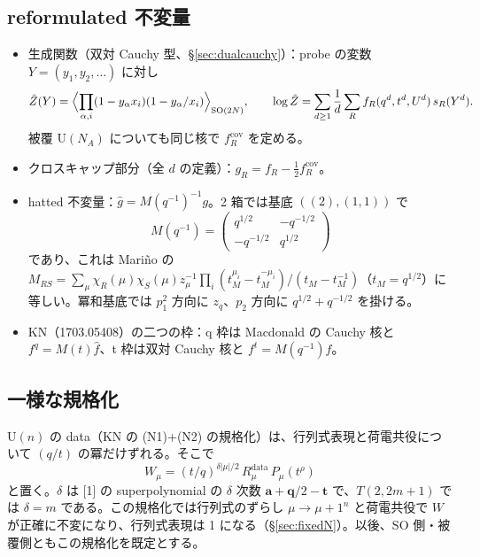 \documentclass[a4paper,10pt]{ltjsarticle}
\newcommand{\ba}{\bm{a}}
\newcommand{\bq}{\bm{q}}
\newcommand{\bt}{\bm{t}}
\begin{document}
\subsection{reformulated 不変量}
\begin{itemize}
\item 生成関数（双対 Cauchy 型、§\ref{sec:dualcauchy}）：probe の変数 $Y = (y_1, y_2, \dots)$ に対し
\[
\tilde Z(Y) = \Bigl\langle \prod_{\alpha, i} (1 - y_\alpha x_i)(1 - y_\alpha / x_i) \Bigr\rangle_{\mathrm{SO}(2N)},\qquad
\log \tilde Z = \sum_{d \ge 1} \frac1d \sum_R f_R(q^d, t^d, U^d)\, s_R(Y^d).
\]
被覆 U$(N_A)$ についても同じ核で $f^{\mathrm{cov}}_R$ を定める。
\item クロスキャップ部分（全 $d$ の定義）：$g_R = f_R - \tfrac12 f^{\mathrm{cov}}_R$。
\item hatted 不変量：$\hat g = M(q^{-1})^{-1} g$。2 箱では基底 $((2), (1,1))$ で
\[
M(q^{-1}) = \begin{pmatrix} q^{1/2} & -q^{-1/2} \\ -q^{-1/2} & q^{1/2} \end{pmatrix}
\]
であり、これは Mariño の $M_{RS} = \sum_\mu \chi_R(\mu)\chi_S(\mu) z_\mu^{-1} \prod_i (t_M^{\mu_i} - t_M^{-\mu_i})/(t_M - t_M^{-1})$（$t_M = q^{1/2}$）に等しい。冪和基底では $p_1^2$ 方向に $z_q$、$p_2$ 方向に $q^{1/2} + q^{-1/2}$ を掛ける。
\item KN（1703.05408）の二つの枠：q 枠は Macdonald の Cauchy 核と $f^q = M(t) \hat f$、t 枠は双対 Cauchy 核と $f^{t} = M(q^{-1}) \hat f$。
\end{itemize}

\subsection{一様な規格化}
U$(n)$ の data（KN の (N1)+(N2) の規格化）は、行列式表現と荷電共役について $(q/t)$ の冪だけずれる。そこで
\[
W_\mu = (t/q)^{\delta |\mu|/2}\, R^{\mathrm{data}}_\mu\, P_\mu(t^\rho)
\]
と置く。$\delta$ は [1] の superpolynomial の $\delta$ 次数 $\ba + \bq/2 - \bt$ で、$T(2,2m+1)$ では $\delta = m$ である。この規格化では行列式のずらし $\mu \to \mu + 1^n$ と荷電共役で $W$ が正確に不変になり、行列式表現は 1 になる（§\ref{sec:fixedN}）。以後、SO 側・被覆側ともこの規格化を既定とする。
\end{document}

